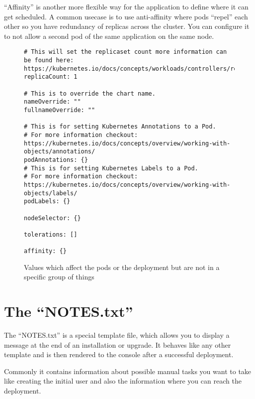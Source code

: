 \enquote{Affinity} is another more flexible way for the application to define where it can get scheduled.
A common usecase is to use anti-affinity where pods \enquote{repel} each other so you have redundancy of replicas across the cluster.
You can configure it to not allow a second pod of the same application on the same node.
\begin{figure}[h]
\begin{verbatim}
# This will set the replicaset count more information can be found here: https://kubernetes.io/docs/concepts/workloads/controllers/replicaset/
replicaCount: 1

# This is to override the chart name.
nameOverride: ""
fullnameOverride: ""

# This is for setting Kubernetes Annotations to a Pod.
# For more information checkout: https://kubernetes.io/docs/concepts/overview/working-with-objects/annotations/ 
podAnnotations: {}
# This is for setting Kubernetes Labels to a Pod.
# For more information checkout: https://kubernetes.io/docs/concepts/overview/working-with-objects/labels/
podLabels: {}

nodeSelector: {}

tolerations: []

affinity: {}
\end{verbatim}
\caption{Values which affect the pods or the deployment but are not in a specific group of things}\label{code:misc_values}
\end{figure}

\section{The \enquote{NOTES.txt}}
The \enquote{NOTES.txt} is a special template file, which allows you to display a message at the end of an installation or upgrade.
It behaves like any other template and is then rendered to the console after a successful deployment.

Commonly it contains information about possible manual tasks you want to take like creating the initial user and also the information where you can reach the deployment.

